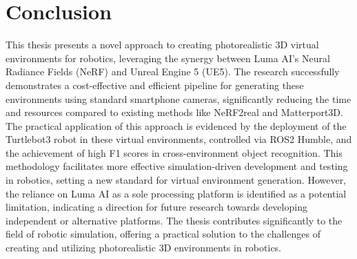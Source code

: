 \chapter{Conclusion}
\label{chap:conclusion}
This thesis presents a novel approach to creating photorealistic 3D virtual environments for robotics, leveraging the synergy between Luma AI’s Neural Radiance Fields (NeRF) and Unreal Engine 5 (UE5). The research successfully demonstrates a cost-effective and efficient pipeline for generating these environments using standard smartphone cameras, significantly reducing the time and resources compared to existing methods like NeRF2real and Matterport3D. The practical application of this approach is evidenced by the deployment of the Turtlebot3 robot in these virtual environments, controlled via ROS2 Humble, and the achievement of high F1 scores in cross-environment object recognition. This methodology facilitates more effective simulation-driven development and testing in robotics, setting a new standard for virtual environment generation. However, the reliance on Luma AI as a sole processing platform is identified as a potential limitation, indicating a direction for future research towards developing independent or alternative platforms. The thesis contributes significantly to the field of robotic simulation, offering a practical solution to the challenges of creating and utilizing photorealistic 3D environments in robotics.





